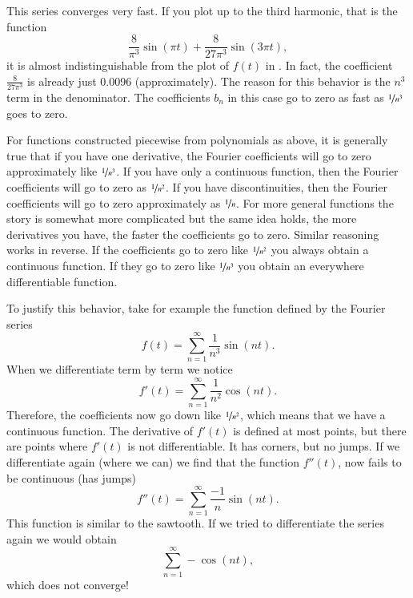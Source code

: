 \documentclass[12pt]{book}
\begin{document}
\begin{example}
This series converges very fast.
If you plot up
to the third harmonic, that is the function
\begin{equation*}
\frac{8}{\pi^3} \sin (\pi t) + 
\frac{8}{27 \pi^3} \sin (3 \pi t) ,
\end{equation*}
it is almost indistinguishable from the plot of $f(t)$ in
.
In fact, the coefficient 
$\frac{8}{27 \pi^3}$ is already just 0.0096 (approximately).
The reason for this behavior is the $n^3$ term in the denominator.
The coefficients $b_n$ in this case go to zero as fast as
$\nicefrac{1}{n^3}$ goes to
zero.
\end{example}

For functions constructed piecewise from polynomials as above,
it is generally true that
if you have one derivative, the Fourier
coefficients will go to zero approximately like $\nicefrac{1}{n^3}$.  If you
have only a continuous function, then the Fourier coefficients will go to
zero as $\nicefrac{1}{n^2}$.  If you have discontinuities, then 
the Fourier coefficients will go to zero approximately as $\nicefrac{1}{n}$.
For more general functions the story is somewhat more complicated but the
same idea holds, the more derivatives you have, the faster the coefficients
go to zero.  Similar reasoning works in reverse.  If the coefficients go to
zero like $\nicefrac{1}{n^2}$ you always obtain a continuous function.  If
they go to zero like $\nicefrac{1}{n^3}$ you obtain an everywhere differentiable
function.

To justify this behavior, take for example the function defined by
the Fourier series
\begin{equation*}
f(t) = \sum_{n=1}^\infty \frac{1}{n^3} \sin (n t) .
\end{equation*}
When we differentiate term by term we notice
\begin{equation*}
f'(t) = \sum_{n=1}^\infty \frac{1}{n^2} \cos (n t) .
\end{equation*}
Therefore, the coefficients now go down like $\nicefrac{1}{n^2}$, which 
means that we have a continuous function.
The derivative 
of $f'(t)$ is defined
at most points, but there are points where $f'(t)$ is not differentiable.
It has corners, but no jumps.
If we
differentiate again (where we can) we find that the function
$f''(t)$,
now fails to be continuous (has jumps)
\begin{equation*}
f''(t) = \sum_{n=1}^\infty \frac{-1}{n} \sin (n t) .
\end{equation*}
This function is similar to the sawtooth.  If we tried to differentiate
the series again we would obtain
\begin{equation*}
\sum_{n=1}^\infty -\cos (n t) ,
\end{equation*}
which does not converge!
\end{document}

